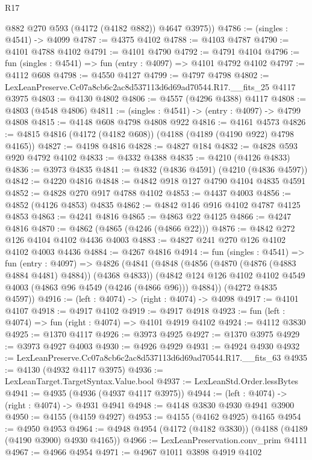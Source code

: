 \begin{lexlean}{R17}
\begin{coremodule}
        @882
        @270
        @593
        (@4172 (@4182 @882))
        @4647
        @3975))
@4786 := (singles : @4541) -> @4099
@4787 := @4375 @4102
@4788 := @4103 @4787
@4790 := @4101 @4788 @4102
@4791 := @4101 @4790
@4792 := @4791 @4104
@4796 := fun (singles : @4541) => fun (entry : @4097) => @4101 @4792 @4102
@4797 := @4112 @608
@4798 := @4550 @4127
@4799 := @4797 @4798
@4802 := LexLeanPreserve.Cc07a8cb6c2ac8d537113d6d69ad70544.R17.__fits_25 @4117 @3975
@4803 := @4130 @4802
@4806 := @4557 (@4296 @4388) @4117
@4808 := @4803 (@4548 @4806)
@4811 := (singles : @4541) -> (entry : @4097) -> @4799 @4808
@4815 := @4148 @608 @4798 @4808 @922
@4816 := @4161 @4573
@4826 := @4815 @4816 (@4172 (@4182 @608)) (@4188 (@4189 (@4190 @922) @4798 @4165))
@4827 := @4198 @4816
@4828 := @4827 @184
@4832 := @4828 @593 @920 @4792 @4102
@4833 := @4332 @4388
@4835 := @4210 (@4126 @4833)
@4836 := @3973 @4835
@4841 := @4832 (@4836 @4591) (@4210 (@4836 @4597))
@4842 := @4220 @4816
@4848 := @4842 @918 @127 @4790 @4104 @4835 @4591
@4852 := @4828 @270 @917 @4788 @4102
@4853 := @4437 @4003
@4856 := @4852 (@4126 @4853) @4835
@4862 := @4842 @146 @916 @4102 @4787 @4125 @4853
@4863 := @4241 @4816
@4865 := @4863 @22 @4125
@4866 := @4247 @4816
@4870 := @4862 (@4865 (@4246 (@4866 @22)))
@4876 := @4842 @272 @126 @4104 @4102 @4436 @4003
@4883 := @4827 @241 @270 @126 @4102 @4102 @4003 @4436
@4884 := @4267 @4816
@4914 := fun (singles : @4541) =>
  fun (entry : @4097) =>
  @4826
    (@4841
      (@4848
        (@4856 (@4870 (@4876 (@4883 @4884 @4481) @4884)) (@4368 @4833))
        (@4842 @124 @126 @4102 @4102 @4549 @4003 (@4863 @96 @4549 (@4246 (@4866 @96))) @4884))
      (@4272 @4835 @4597))
@4916 := (left : @4074) -> (right : @4074) -> @4098
@4917 := @4101 @4107
@4918 := @4917 @4102
@4919 := @4917 @4918
@4923 := fun (left : @4074) => fun (right : @4074) => @4101 @4919 @4102
@4924 := @4112 @3830
@4925 := @1370 @4117
@4926 := @3973 @4925
@4927 := @1370 @3975
@4929 := @3973 @4927 @4003
@4930 := @4926 @4929
@4931 := @4924 @4930
@4932 := LexLeanPreserve.Cc07a8cb6c2ac8d537113d6d69ad70544.R17.__fits_63
@4935 := @4130 (@4932 @4117 @3975)
@4936 := LexLeanTarget.TargetSyntax.Value.bool
@4937 := LexLeanStd.Order.lessBytes
@4941 := @4935 (@4936 (@4937 @4117 @3975))
@4944 := (left : @4074) -> (right : @4074) -> @4931 @4941
@4948 := @4148 @3830 @4930 @4941 @3900
@4950 := @4155 (@4159 @4927)
@4953 := @4155 (@4162 @4925) @4165
@4954 := @4950 @4953
@4964 := @4948 @4954 (@4172 (@4182 @3830)) (@4188 (@4189 (@4190 @3900) @4930 @4165))
@4966 := LexLeanPreservation.conv_prim @4111
@4967 := @4966 @4954
@4971 := @4967 @1011 @3898 @4919 @4102

\end{coremodule}
\end{lexlean}
